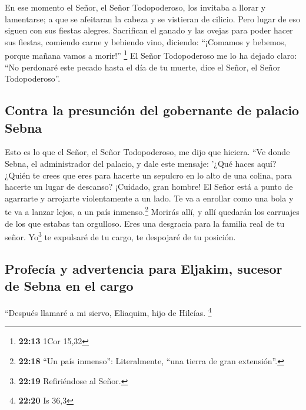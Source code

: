  En ese momento el Señor, el Señor Todopoderoso, los
invitaba a llorar y lamentarse; a que se afeitaran la cabeza y se
vistieran de cilicio.  Pero lugar de eso siguen con sus
fiestas alegres. Sacrifican el ganado y las ovejas para poder hacer sus
fiestas, comiendo carne y bebiendo vino, diciendo: ``¡Comamos y bebemos,
porque mañana vamos a morir!'' \footnote{\textbf{22:13} 1Cor 15,32}
 El Señor Todopoderoso me lo ha dejado claro: ``No
perdonaré este pecado hasta el día de tu muerte, dice el Señor, el Señor
Todopoderoso''.

\hypertarget{contra-la-presunciuxf3n-del-gobernante-de-palacio-sebna}{%
\subsection{Contra la presunción del gobernante de palacio
Sebna}\label{contra-la-presunciuxf3n-del-gobernante-de-palacio-sebna}}

 Esto es lo que el Señor, el Señor Todopoderoso, me dijo
que hiciera. ``Ve donde Sebna, el administrador del palacio, y dale este
mensaje:  '¿Qué haces aquí? ¿Quién te crees que eres para
hacerte un sepulcro en lo alto de una colina, para hacerte un lugar de
descanso?  ¡Cuidado, gran hombre! El Señor está a punto
de agarrarte y arrojarte violentamente a un lado.  Te va
a enrollar como una bola y te va a lanzar lejos, a un país
inmenso.\footnote{\textbf{22:18} ``Un país inmenso'': Literalmente,
  ``una tierra de gran extensión''.} Morirás allí, y allí quedarán los
carruajes de los que estabas tan orgulloso. Eres una desgracia para la
familia real de tu señor.  Yo\footnote{\textbf{22:19}
  Refiriéndose al Señor.} te expulsaré de tu cargo, te despojaré de tu
posición.

\hypertarget{profecuxeda-y-advertencia-para-eljakim-sucesor-de-sebna-en-el-cargo}{%
\subsection{Profecía y advertencia para Eljakim, sucesor de Sebna en el
cargo}\label{profecuxeda-y-advertencia-para-eljakim-sucesor-de-sebna-en-el-cargo}}

 ``Después llamaré a mi siervo, Eliaquim, hijo de
Hilcías. \footnote{\textbf{22:20} Is 36,3}


